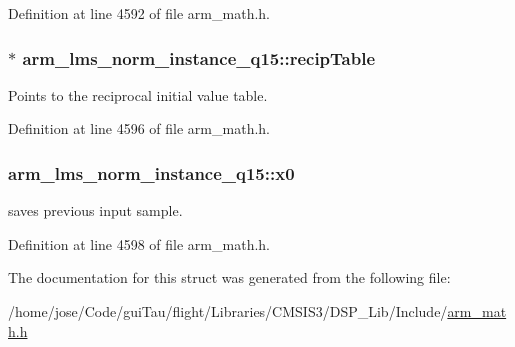 Definition at line 4592 of file arm\-\_\-math.\-h.

\hypertarget{structarm__lms__norm__instance__q15_a9aabb0e4c79f3db807e7a441fa36f5f8}{
\subsubsection[{recip\-Table}]{$\ast$ arm\-\_\-lms\-\_\-norm\-\_\-instance\-\_\-q15\-::recip\-Table}}\label{structarm__lms__norm__instance__q15_a9aabb0e4c79f3db807e7a441fa36f5f8}
Points to the reciprocal initial value table. 

Definition at line 4596 of file arm\-\_\-math.\-h.

\hypertarget{structarm__lms__norm__instance__q15_a3fc1d6f97d2c6d5324871de6895cb7e9}{
\subsubsection[{x0}]{ arm\-\_\-lms\-\_\-norm\-\_\-instance\-\_\-q15\-::x0}}\label{structarm__lms__norm__instance__q15_a3fc1d6f97d2c6d5324871de6895cb7e9}
saves previous input sample. 

Definition at line 4598 of file arm\-\_\-math.\-h.



The documentation for this struct was generated from the following file\-:\begin{DoxyCompactItemize}
\item 
/home/jose/\-Code/gui\-Tau/flight/\-Libraries/\-C\-M\-S\-I\-S3/\-D\-S\-P\-\_\-\-Lib/\-Include/\hyperlink{arm__math_8h}{arm\-\_\-math.\-h}\end{DoxyCompactItemize}
